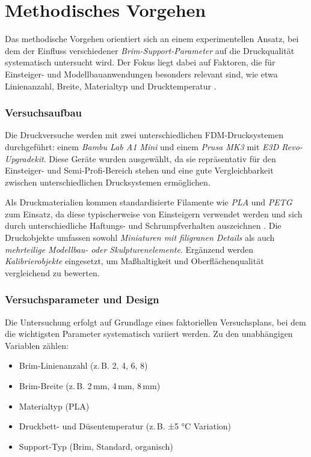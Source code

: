 \chapter{Methodisches Vorgehen}
\label{cha:Methodisches Vorgehen}

Das methodische Vorgehen orientiert sich an einem experimentellen Ansatz, bei dem der Einfluss verschiedener \textit{Brim-Support-Parameter} auf die Druckqualität systematisch untersucht wird. Der Fokus liegt dabei auf Faktoren, die für Einsteiger- und Modellbauanwendungen besonders relevant sind, wie etwa Linienanzahl, Breite, Materialtyp und Drucktemperatur \cite{Kristiawan2021, FFFPolymerReview}.  

\subsection{Versuchsaufbau}

Die Druckversuche werden mit zwei unterschiedlichen FDM-Drucksystemen durchgeführt: einem \textit{Bambu Lab A1 Mini} und einem \textit{Prusa MK3} mit \textit{E3D Revo-Upgradekit}. Diese Geräte wurden ausgewählt, da sie repräsentativ für den Einsteiger- und Semi-Profi-Bereich stehen und eine gute Vergleichbarkeit zwischen unterschiedlichen Drucksystemen ermöglichen.  

Als Druckmaterialien kommen standardisierte Filamente wie \textit{PLA} und \textit{PETG} zum Einsatz, da diese typischerweise von Einsteigern verwendet werden und sich durch unterschiedliche Haftungs- und Schrumpfverhalten auszeichnen \cite{FDMReview2021}. Die Druckobjekte umfassen sowohl \textit{Miniaturen mit filigranen Details} als auch \textit{mehrteilige Modellbau- oder Skulpturenelemente}. Ergänzend werden \textit{Kalibrierobjekte} eingesetzt, um Maßhaltigkeit und Oberflächenqualität vergleichend zu bewerten.  

\subsection{Versuchsparameter und Design}

Die Untersuchung erfolgt auf Grundlage eines faktoriellen Versuchsplans, bei dem die wichtigsten Parameter systematisch variiert werden.  
Zu den unabhängigen Variablen zählen:
\begin{itemize}
  \item Brim-Linienanzahl (z.\,B. 2, 4, 6, 8)
  \item Brim-Breite (z.\,B. 2\,mm, 4\,mm, 8\,mm)
  \item Materialtyp (PLA)
  \item Druckbett- und Düsentemperatur (z.\,B. ±5 °C Variation)
  \item Support-Typ (Brim, Standard, organisch)
\end{itemize}

